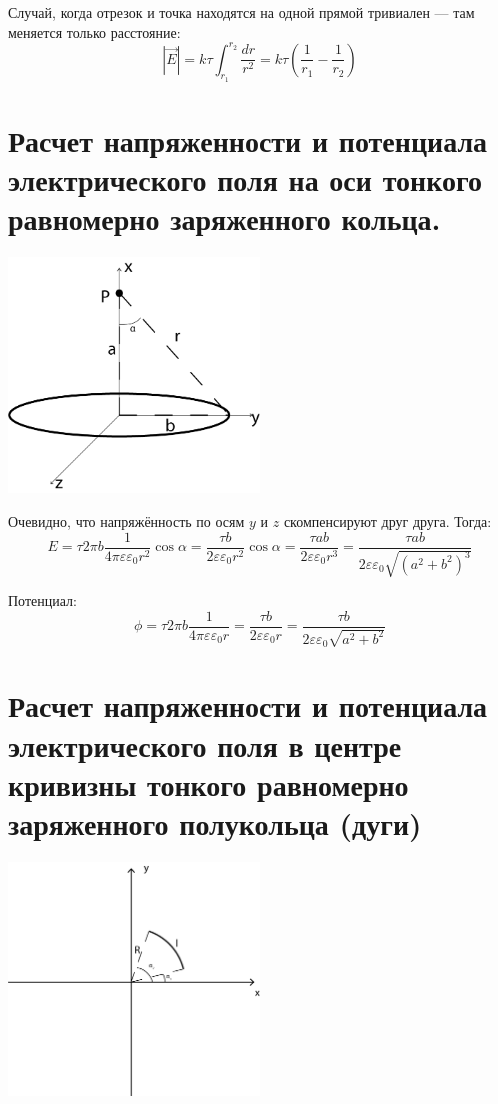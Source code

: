 \documentclass[12pt]{report}
\begin{document}
Случай, когда отрезок и точка находятся на одной прямой тривиален --- там меняется только расстояние:
\[
    |\vec{E}| = k\tau \int_{r_1}^{r_2}\dfrac{dr}{r^2} = k\tau\left(\dfrac{1}{r_1} - \dfrac{1}{r_2}\right)
\]

\section{Расчет напряженности и потенциала электрического поля на оси тонкого равномерно заряженного кольца.}
\begin{center}
    \includegraphics[width=0.5\textwidth]{graphics/t02.png}
\end{center}
Очевидно, что напряжённость по осям $y$ и $z$ скомпенсируют друг друга. Тогда:
\[
    E = \tau 2\pi b \dfrac{1}{4\pi \varepsilon\varepsilon_0 r^2} \cos \alpha
    = \dfrac{\tau b}{2\varepsilon\varepsilon_0 r^2} \cos \alpha
    = \dfrac{\tau ab}{2\varepsilon\varepsilon_0 r^3}
    = \dfrac{\tau ab}{2\varepsilon\varepsilon_0 \sqrt{(a^2 + b^2)^3}}
\]

Потенциал:
\[
    \phi = \tau 2\pi b \dfrac{1}{4\pi \varepsilon\varepsilon_0 r}
    = \dfrac{\tau b}{2\varepsilon\varepsilon_0 r}
    = \dfrac{\tau b}{2 \varepsilon \varepsilon_0 \sqrt{a^2 + b^2}}
\]

\section{Расчет напряженности и потенциала электрического поля в центре кривизны тонкого равномерно заряженного полукольца (дуги)}
\begin{center}
    \includegraphics[width=0.5\textwidth]{graphics/t03.png}
\end{center}
\end{document}
